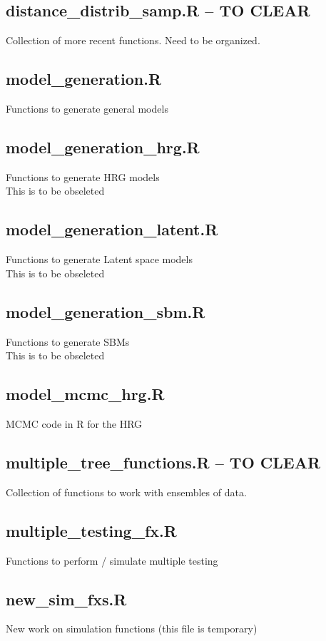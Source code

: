 \documentclass[11pt]{article}
\begin{document}
\subsection{distance\_distrib\_samp.R -- TO CLEAR}
Collection of more recent functions. Need to be organized. 


\subsection{model\_generation.R}
Functions to generate general models

\subsection{model\_generation\_hrg.R}
Functions to generate HRG models \\
This is to be obseleted

\subsection{model\_generation\_latent.R}
Functions to generate Latent space models \\
This is to be obseleted
\subsection{model\_generation\_sbm.R}
Functions to generate SBMs \\
This is to be obseleted

\subsection{model\_mcmc\_hrg.R}
MCMC code in R for the HRG

\subsection{multiple\_tree\_functions.R -- TO CLEAR}
Collection of functions to work with ensembles of data. 

\subsection{multiple\_testing\_fx.R}
Functions to perform / simulate multiple testing

\subsection{new\_sim\_fxs.R}
New work on simulation functions (this file is temporary)
\end{document}
